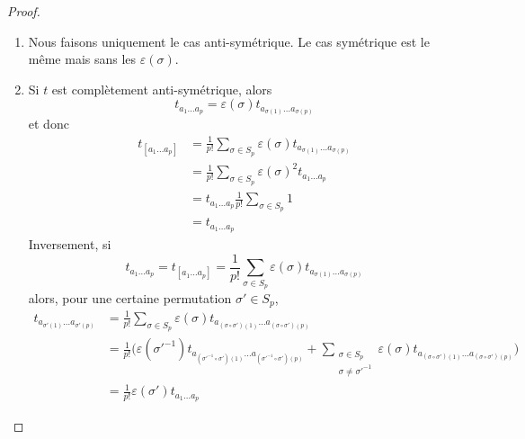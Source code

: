 \documentclass[a4paper,11pt]{report}
\theoremstyle{definition}
\theoremstyle{plain}
\theoremstyle{definition}
\theoremstyle{remark}
\begin{document}
                \begin{proof}${}$
                    \begin{enumerate}[label = \textit{\roman*)}]
                        \item Nous faisons uniquement le cas anti-symétrique. Le cas symétrique est le même mais sans les $\varepsilon(\sigma)$.
                        \item Si $t$ est complètement anti-symétrique, alors 
                        \begin{equation}
                            t_{a_1\dots a_p} = \varepsilon(\sigma)t_{a_{\sigma(1)}\dots a_{\sigma(p)}}
                        \end{equation}
                        et donc
                        \begin{align}
                            t_{[a_1\dots a_p]} &= \frac{1}{p!}\sum_{\sigma\in S_p}\varepsilon(\sigma) t_{a_{\sigma(1)}\dots a_{\sigma(p)}}\\
                            &= \frac{1}{p!}\sum_{\sigma\in S_p}\varepsilon(\sigma)^2 t_{a_1\dots a_p}\\
                            &= t_{a_1\dots a_p} \frac{1}{p!}\sum_{\sigma\in S_p}1\\
                            &= t_{a_1\dots a_p}
                        \end{align}
                        Inversement, si
                        \begin{equation}
                            t_{a_1\dots a_p} = t_{[a_1\dots a_p]}
                            = \frac{1}{p!}\sum_{\sigma\in S_p}\varepsilon(\sigma) t_{a_{\sigma(1)}\dots a_{\sigma(p)}}
                        \end{equation}
                        alors, pour une certaine permutation $\sigma'\in S_p$,
                        \begin{align}
                            t_{a_{\sigma'(1)}\dots a_{\sigma'(p)}} &=  \frac{1}{p!}\sum_{\sigma\in S_p}\varepsilon(\sigma) t_{a_{(\sigma\circ\sigma')(1)}\dots a_{(\sigma\circ\sigma')(p)}}\\
                            &= \frac{1}{p!}\bigg( \varepsilon(\sigma'^{-1}) t_{a_{(\sigma'^{-1}\circ\sigma')(1)}\dots a_{(\sigma'^{-1}\circ\sigma')(p)}}+\sum_{\substack{\sigma\in S_p\\\sigma\neq\sigma'^{-1}}} \varepsilon(\sigma) t_{a_{(\sigma\circ\sigma')(1)}\dots a_{(\sigma\circ\sigma')(p)}} \bigg)\\
                            &= \frac{1}{p!}  \varepsilon(\sigma')t_{a_1\dots a_p}

\end{align}
\end{enumerate}
\end{proof}
\end{document}
